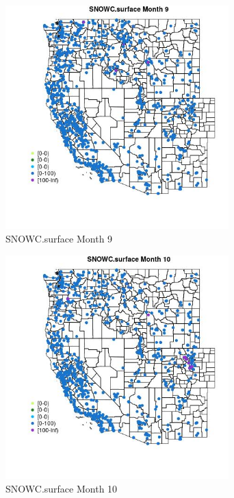 \begin{figure} 
\centering  
\includegraphics[width=0.77\textwidth]{Code_Outputs/Report_ML_input_PM25_Step4_part_f_de_duplicated_aves_prioritize_24hr_obswNAs_MapObsMo9SNOWCsurface.jpg} 
\caption{\label{fig:Report_ML_input_PM25_Step4_part_f_de_duplicated_aves_prioritize_24hr_obswNAsMapObsMo9SNOWCsurface}SNOWC.surface Month 9} 
\end{figure} 
 

\begin{figure} 
\centering  
\includegraphics[width=0.77\textwidth]{Code_Outputs/Report_ML_input_PM25_Step4_part_f_de_duplicated_aves_prioritize_24hr_obswNAs_MapObsMo10SNOWCsurface.jpg} 
\caption{\label{fig:Report_ML_input_PM25_Step4_part_f_de_duplicated_aves_prioritize_24hr_obswNAsMapObsMo10SNOWCsurface}SNOWC.surface Month 10} 
\end{figure} 
 

